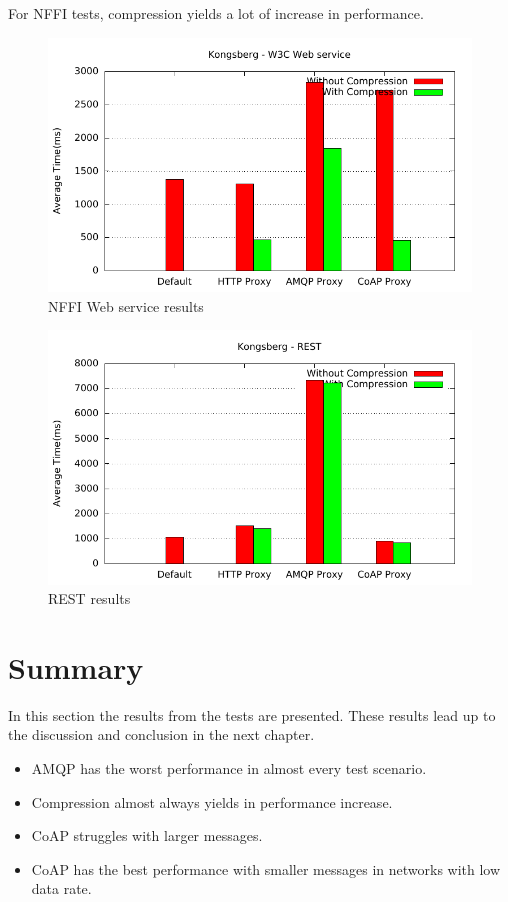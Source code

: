 For NFFI tests, compression yields a lot of increase in performance.

\begin{figure}[H]
\center
\includegraphics[scale=0.75]{../results/kongsberg/nffi/out.pdf}
\caption{NFFI Web service results}
\end{figure}

\begin{figure}[H]
\center
\includegraphics[scale=0.75]{../results/kongsberg/rest/out.pdf}
\caption{REST results}
\end{figure}



\section{Summary}

In this section the results from the tests are presented. These results lead up
to the discussion and conclusion in the next chapter.

\begin{itemize}
\item AMQP has the worst performance in almost every test scenario.
\item Compression almost always yields in performance increase.
\item CoAP struggles with larger messages.
\item CoAP has the best performance with smaller messages in networks with low data rate.
\end{itemize}

